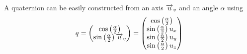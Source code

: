 A quaternion can be easily constructed from an axis $\overrightarrow{u}_v$ and an angle $\alpha $ using
\begin{equation}
q_{} = \begin{pmatrix}
\cos \left( \tfrac \alpha 2 \right) \\
\sin \left( \tfrac \alpha 2 \right) \overrightarrow{u}_v
\end{pmatrix} = \begin{pmatrix}
\cos \left( \tfrac \alpha 2 \right) \\
\sin \left( \tfrac \alpha 2 \right) u_x \\
\sin \left( \tfrac \alpha 2 \right) u_y \\
\sin \left( \tfrac \alpha 2 \right) u_z
\end{pmatrix}
\end{equation}
